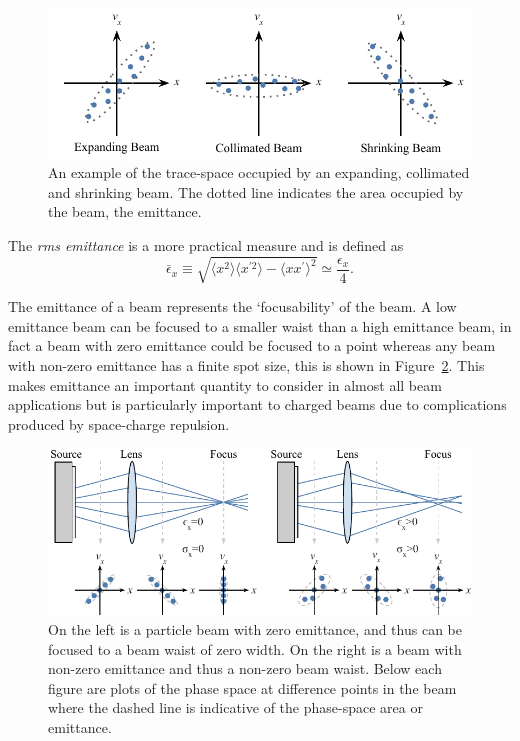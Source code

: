 \begin{figure}
\center
\includegraphics{part2/Figs/EmittanceExample.pdf}
\caption[Trace-space for expanding, collimated and shrinking beam.]{An example of the trace-space occupied by an expanding, collimated and shrinking beam. The dotted line indicates the area occupied by the beam, the emittance.}
\label{figure:emittance_example}
\end{figure}

The \emph{\gls{rms} emittance} is a more practical measure and is defined as
\begin{equation}\label{emittance}
\bar{\epsilon}_x \equiv \sqrt{\langle x^2\rangle \langle x^{\prime 2}\rangle - \langle x x^\prime\rangle^2} \simeq \frac{\epsilon_x}{4}.
\end{equation}

The emittance of a beam represents the `focusability' of the beam.
A low emittance beam can be focused to a smaller waist than a high emittance beam, in fact a beam with zero emittance could be focused to a point whereas any beam with non-zero emittance has a finite spot size, this is shown in Figure~\ref{figure:focusability}.
This makes emittance an important quantity to consider in almost all beam applications but is particularly important to charged beams due to complications produced by space-charge repulsion.

\begin{figure}
\center
\includegraphics{part2/Figs/EmittanceFocasability.pdf}
\caption[Comparison of zero and non-zero emittance.]{On the left is a particle beam with zero emittance, and thus can be focused to a beam waist of zero width. On the right is a beam with non-zero emittance and thus a non-zero beam waist. Below each figure are plots of the phase space at difference points in the beam where the dashed line is indicative of the phase-space area or emittance.}
\label{figure:focusability}
\end{figure}

